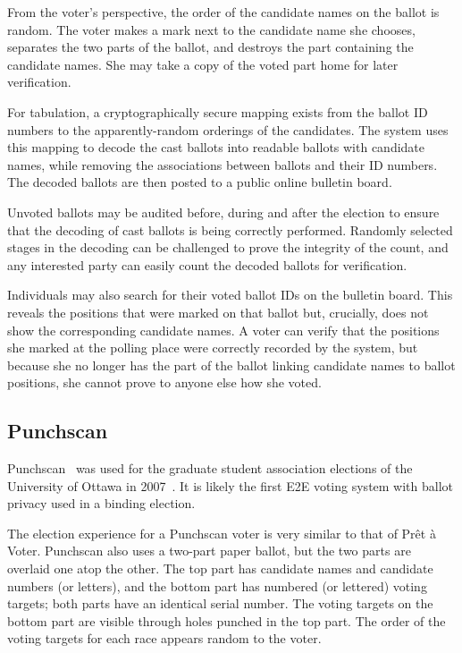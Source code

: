 From the voter's perspective, the order of the candidate names on the
ballot is random. The voter makes a mark next to the candidate name
she chooses, separates the two parts of the ballot, and destroys the
part containing the candidate names. She may take a copy of the voted
part home for later verification.

For tabulation, a cryptographically secure mapping exists from the
ballot ID numbers to the apparently-random orderings of the
candidates. The system uses this mapping to decode the cast ballots
into readable ballots with candidate names, while removing the
associations between ballots and their ID numbers. The decoded ballots
are then posted to a public online bulletin board.

Unvoted ballots may be audited before, during and after the election
to ensure that the decoding of cast ballots is being correctly
performed. Randomly selected stages in the decoding can be challenged
to prove the integrity of the count, and any interested party can
easily count the decoded ballots for verification.

Individuals may also search for their voted ballot IDs on the bulletin
board. This reveals the positions that were marked on that ballot but,
crucially, does not show the corresponding candidate names. A voter
can verify that the positions she marked at the polling place were
correctly recorded by the system, but because she no longer has the
part of the ballot linking candidate names to ballot positions, she
cannot prove to anyone else how she voted.

\subsection{Punchscan}
\label{sec:punchscan}

Punchscan~\cite{popoveniuc2006,popoveniuc2010punchscan} was used for
the graduate student association elections of the University of Ottawa
in 2007~\cite{essex2007}. It is likely the first E2E voting system
with ballot privacy used in a binding election.

The election experience for a Punchscan voter is very similar to that
of Prêt à Voter. Punchscan also uses a two-part paper ballot, but the
two parts are overlaid one atop the other. The top part has candidate
names and candidate numbers (or letters), and the bottom part has
numbered (or lettered) voting targets; both parts have an identical
serial number. The voting targets on the bottom part are visible
through holes punched in the top part. The order of the voting targets
for each race appears random to the voter.


